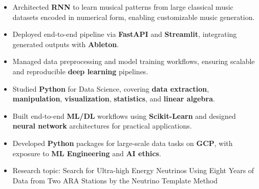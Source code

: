 \documentclass[10pt,a4paper,ragged2e,withhyper]{altacv}
\begin{document}
\medskip


\begin{itemize}
\item Architected {\bf RNN} to learn musical patterns from large classical music datasets encoded in numerical form, enabling customizable music generation.
\item Deployed end-to-end pipeline via {\bf FastAPI} and {\bf Streamlit}, integrating generated outputs with {\bf Ableton}.
\item Managed data preprocessing and model training workflows, ensuring scalable and reproducible {\bf deep learning} pipelines.
\end{itemize}


\begin{itemize}
\item Studied {\bf Python} for Data Science, covering {\bf data extraction}, {\bf manipulation}, {\bf visualization}, {\bf statistics}, and {\bf linear algebra}.
\item Built end-to-end {\bf ML/DL} workflows using {\bf Scikit-Learn} and designed {\bf neural network} architectures for practical applications.
\item Developed {\bf Python} packages for large-scale data tasks on {\bf GCP}, with exposure to {\bf ML Engineering} and {\bf AI ethics}.
\end{itemize}
\divider

\begin{itemize}
\item Research topic: Search for Ultra-high Energy Neutrinos Using Eight Years of Data from Two ARA Stations by the Neutrino Template Method
\end{itemize}
\divider
\end{document}
